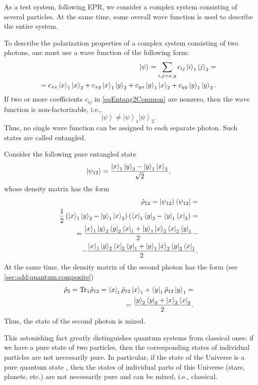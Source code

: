 As a test system, following EPR, we consider a complex
system consisting of several particles. At the same time, some overall wave function is used to describe the entire
system.

To describe the polarization properties of a complex system consisting of two
photons, one must use a wave function of the following form:
\begin{eqnarray}
\left|\psi\right> = \sum_{i,j = x,y} 
c_{ij}\ket{i}_1\ket{j}_2 = 
\nonumber \\
= c_{xx} \ket{x}_1\ket{x}_2 +
c_{xy} \ket{x}_1\ket{y}_2 +
c_{yx} \ket{y}_1\ket{x}_2 +
c_{yy} \ket{y}_1\ket{y}_2.
\label{eqEntang2Common}
\end{eqnarray}
If two or more coefficients $c_{ij}$ in \eqref{eqEntang2Common}
are nonzero, then the wave function is non-factorizable, i.e., 
\[
\left|\psi\right> \ne \left|\psi\right>_1 \left|\psi\right>_2.
\]
Thus, no single wave function can be assigned to each separate photon. Such states are called entangled.

\begin{remark}
Consider the following pure entangled state
\[
  \ket{\psi_{12}} = \frac{
    \ket{ x }_1\ket{ y }_2 -
    \ket{ y }_1\ket{ x }_2
  }{\sqrt{2}},
\]
whose density matrix has the form
\begin{eqnarray}
\hat{\rho}_{12} = \ket{\psi_{12}}\bra{\psi_{12}} =
\nonumber \\ 
\frac{1}{2}
\left(
\ket{ x }_1\ket{ y }_2 -
\ket{ y }_1\ket{ x }_2
\right)
\left(
\bra{ x }_1\bra{ y }_2 -
\bra{ y }_1\bra{ x }_2
\right) =
\nonumber \\
= 
\frac{
\ket{ x }_1\ket{ y }_2\bra{ y }_2\bra{ x }_1 +
\ket{ y }_1\ket{ x }_2\bra{ x }_2\bra{ y }_1 }
{2} -
\nonumber \\
-
\frac{
\ket{ x }_1\ket{ y }_2\bra{ x }_2\bra{ y }_1 +
\ket{ y }_1\ket{ x }_2\bra{ y }_2\bra{ x }_1 
}
{2}.
\nonumber
\end{eqnarray}
At the same time, the density matrix of the second photon has the form
(see \autoref{sec:add:quantum:composite})
\begin{eqnarray}
\hat{\rho}_2 = \mathrm{Tr}_1 \hat{\rho}_{12} = 
\bra{x}_1 \hat{\rho}_{12} \ket{x}_1 +
\bra{y}_1 \hat{\rho}_{12} \ket{y}_1 =
\nonumber \\
=
\frac{
\ket{ y }_2\bra{ y }_2 +
\ket{ x }_2\bra{ x }_2 }
{2}.
\nonumber
\end{eqnarray}
Thus, the state of the second photon is mixed.

This astonishing fact greatly distinguishes
quantum systems from classical ones: if we have a pure state
of two particles, then the corresponding states of individual particles are not
necessarily pure. In particular,
if the state of the Universe is a pure quantum state
\cite{PhysRevD.28.2960}, then 
the states of individual parts of this Universe (stars, planets, etc.) are not
necessarily pure and can be mixed, i.e.,
classical. 

\end{remark}

